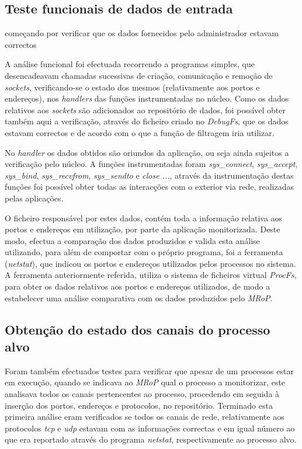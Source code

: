 \subsection{Teste funcionais de dados de entrada}


começando por verificar que os dados fornecidos pelo administrador estavam correctos


A análise funcional foi efectuada recorrendo a programas simples, que desencadeavam chamadas sucessivas de criação, comunicação e remoção de \textit{sockets}, verificando-se o estado dos mesmos (relativamente aos portos e endereços), nos \textit{handlers} das funções instrumentadas no núcleo.
Como os dados relativos aos \textit{sockets} são adicionados ao repositório de dados, foi possível obter também aqui a verificação, através do ficheiro criado no \textit{DebugFs}, que os dados estavam correctos e de acordo com o que a função de filtragem iria utilizar.

No \textit{handler} os dados obtidos são oriundos da aplicação, ou seja ainda sujeitos a verificação pelo núcleo.
A funções instrumentadas foram \textit{sys\_connect}, \textit{sys\_accept}, \textit{sys\_bind}, \textit{sys\_recvfrom}, \textit{sys\_sendto} e \textit{close ...}, através da instrumentação destas funções foi possível obter todas as interacções com o exterior via rede, realizadas pelas aplicações.


O ficheiro responsável por estes dados, contém toda a informação relativa aos portos e endereços em utilização, por parte da aplicação monitorizada.
Deste modo, efectua a comparação dos dados produzidos e valida esta análise utilizando, para além de comportar com o próprio programa, foi a ferramenta (\textit{netstat}), que indicou os portos e endereços utilizados pelos processos no sistema.
A ferramenta anteriormente referida, utiliza o sistema de ficheiros virtual \textit{ProcFs}, para obter os dados relativos aos portos e endereços utilizados,  de modo a estabelecer uma análise comparativa com os dados produzidos pelo \textit{MRoP}.



\subsection{Obtenção do estado dos canais do processo alvo}

Foram também efectuados testes para verificar que apesar de um processos estar em execução, quando se indicava ao \textit{MRoP} qual o processo a monitorizar, este analisava todos os canais pertencentes ao processo, procedendo em seguida à inserção dos portos, endereços e protocolos, no repositório.
Terminado esta primeira análise eram verificados se todos os canais de rede, relativamente aos protocolos \textit{tcp} e \textit{udp} estavam com as informações correctas e em igual número ao que era reportado através do programa \textit{netstat}, respectivamente ao processo alvo.

